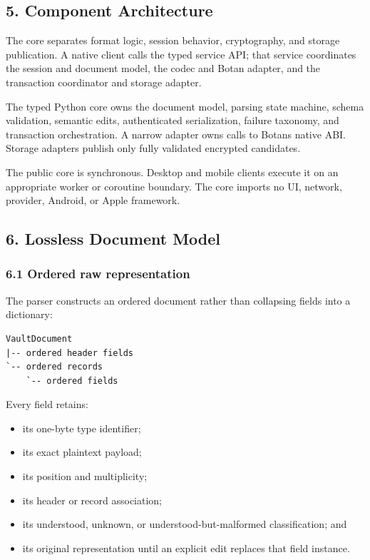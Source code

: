 \documentclass[
  letterpaper,
]{article}
\providecommand{\tightlist}{%
  \setlength{\itemsep}{0pt}\setlength{\parskip}{0pt}}
\begin{document}
\subsection{5. Component Architecture}\label{5-component-architecture}

The core separates format logic, session behavior, cryptography, and storage publication. A native client calls the
typed service API; that service coordinates the session and document model, the codec and Botan adapter, and the
transaction coordinator and storage adapter.

The typed Python core owns the document model, parsing state machine, schema validation, semantic edits, authenticated
serialization, failure taxonomy, and transaction orchestration. A narrow adapter owns calls to Botan\textquotesingle s
native ABI. Storage adapters publish only fully validated encrypted candidates.

The public core is synchronous. Desktop and mobile clients execute it on an appropriate worker or coroutine boundary.
The core imports no UI, network, provider, Android, or Apple framework.

\subsection{6. Lossless Document Model}\label{6-lossless-document-model}

\subsubsection{6.1 Ordered raw representation}\label{61-ordered-raw-representation}

The parser constructs an ordered document rather than collapsing fields into a dictionary:

\begin{lstlisting}
VaultDocument
|-- ordered header fields
`-- ordered records
    `-- ordered fields
\end{lstlisting}

Every field retains:

\begin{itemize}
\tightlist
\item
  its one-byte type identifier;
\item
  its exact plaintext payload;
\item
  its position and multiplicity;
\item
  its header or record association;
\item
  its understood, unknown, or understood-but-malformed classification; and
\item
  its original representation until an explicit edit replaces that field instance.
\end{itemize}
\end{document}
